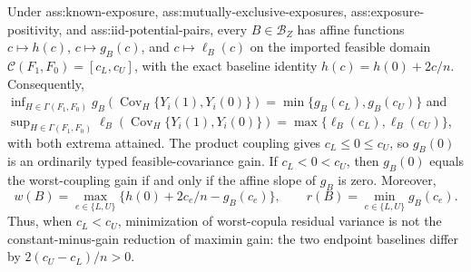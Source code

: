 Under ass:known-exposure, ass:mutually-exclusive-exposures, ass:exposure-positivity, and ass:iid-potential-pairs, every \(B\in\mathcal B_Z\) has affine functions \(c\mapsto h(c)\), \(c\mapsto g_B(c)\), and \(c\mapsto\ell_B(c)\) on the imported feasible domain \(\mathcal C(F_1,F_0)=[c_L,c_U]\), with the exact baseline identity \(h(c)=h(0)+2c/n\). Consequently, \(\inf_{H\in\Gamma(F_1,F_0)}g_B(\operatorname{Cov}_H\{Y_i(1),Y_i(0)\})=\min\{g_B(c_L),g_B(c_U)\}\) and \(\sup_{H\in\Gamma(F_1,F_0)}\ell_B(\operatorname{Cov}_H\{Y_i(1),Y_i(0)\})=\max\{\ell_B(c_L),\ell_B(c_U)\}\), with both extrema attained. The product coupling gives \(c_L\le0\le c_U\), so \(g_B(0)\) is an ordinarily typed feasible-covariance gain. If \(c_L<0<c_U\), then \(g_B(0)\) equals the worst-coupling gain if and only if the affine slope of \(g_B\) is zero. Moreover,
\[
w(B)=\max_{e\in\{L,U\}}\{h(0)+2c_e/n-g_B(c_e)\},
\qquad
r(B)=\min_{e\in\{L,U\}}g_B(c_e).
\]
Thus, when \(c_L<c_U\), minimization of worst-copula residual variance is not the constant-minus-gain reduction of maximin gain: the two endpoint baselines differ by \(2(c_U-c_L)/n>0\).